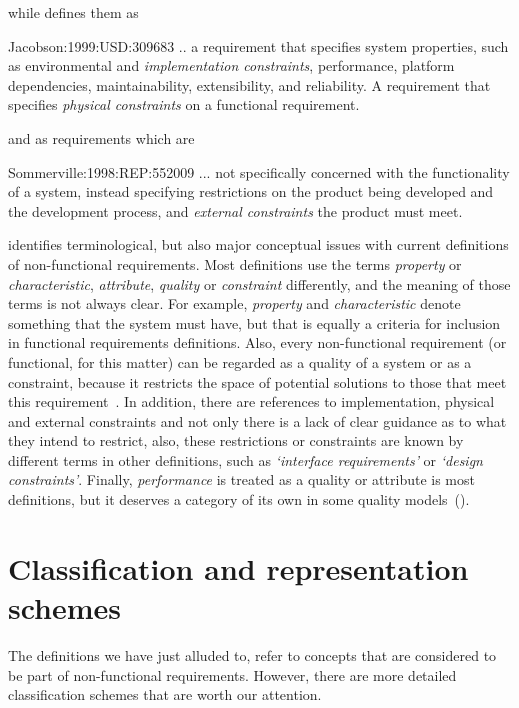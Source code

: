 \documentclass[dissertation,final]{softeng}
\begin{document}
while \citet{Jacobson:1999:USD:309683} defines them as
\begin{displaycquote}{Jacobson:1999:USD:309683}
.. a requirement that specifies system properties, such as environmental and \emph{implementation constraints}, performance, platform dependencies, maintainability, extensibility, and reliability. A requirement that specifies \emph{physical constraints} on a functional requirement.
\end{displaycquote}

and \citet{Sommerville:1998:REP:552009} as requirements which are
\begin{displaycquote}{Sommerville:1998:REP:552009}
... not specifically concerned with the functionality of a system, instead specifying restrictions on the product being developed and the development process, and \emph{external constraints} the product must meet.
\end{displaycquote}

\citet{Glinz:2007ehba} identifies terminological, but also major conceptual issues with current definitions of non-functional requirements. Most definitions use the terms \emph{property} or \emph{characteristic}, \emph{attribute}, \emph{quality} or \emph{constraint} differently, and the meaning of those terms is not always clear. For example, \emph{property} and \emph{characteristic} denote something that the system must have, but that is equally a criteria for inclusion in functional requirements definitions. Also, every non-functional requirement (or functional, for this matter) can be regarded as a quality of a system or as a constraint, because it restricts the space of potential solutions to those that meet this requirement~\citep{Glinz:2007ehba}. In addition, there are references to implementation, physical and external constraints and not only there is a lack of clear guidance as to what they intend to restrict, also, these restrictions or constraints are known by different terms in other definitions, such as \emph{`interface requirements'} or \emph{`design constraints'}. Finally, \emph{performance} is treated as a quality or attribute is most definitions, but it deserves a category of its own in some quality models~().

\section{Classification and representation schemes}

The definitions we have just alluded to, refer to concepts that are considered to be part of non-functional requirements. However, there are more detailed classification schemes that are worth our attention.
\end{document}
